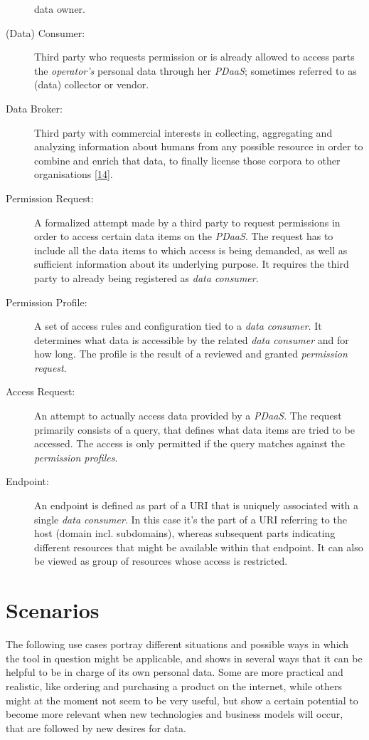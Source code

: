 \documentclass[12pt,english,a4paper,titlepage,cleardoublepage=empty,dottedtoc]{report}
\begin{document}
\begin{description}
data owner.
\item[\protect\hypertarget{terminologies--consumer}{}{(Data) Consumer}:]
Third party who requests permission or is already allowed to access
parts the \emph{operator's} personal data through her \emph{PDaaS};
sometimes referred to as (data) collector or vendor.
\item[\protect\hypertarget{terminologies--data-broker}{}{Data Broker}:]
Third party with commercial interests in collecting, aggregating and
analyzing information about humans from any possible resource in order
to combine and enrich that data, to finally license those corpora to
other organisations
{[}\protect\hyperlink{ref-report_2014_data-brokers}{14}{]}.
\item[Permission Request:]
A formalized attempt made by a third party to request permissions in
order to access certain data items on the \emph{PDaaS}. The request has
to include all the data items to which access is being demanded, as well
as sufficient information about its underlying purpose. It requires the
third party to already being registered as \emph{data consumer}.
\item[Permission Profile:]
A set of access rules and configuration tied to a \emph{data consumer}.
It determines what data is accessible by the related \emph{data
consumer} and for how long. The profile is the result of a reviewed and
granted \emph{permission request}.
\item[Access Request:]
An attempt to actually access data provided by a \emph{PDaaS}. The
request primarily consists of a query, that defines what data items are
tried to be accessed. The access is only permitted if the query matches
against the \emph{permission profiles}.
\item[Endpoint:]
An endpoint is defined as part of a URI that is uniquely associated with
a single \emph{data consumer}. In this case it's the part of a URI
referring to the host (domain incl. subdomains), whereas subsequent
parts indicating different resources that might be available within that
endpoint. It can also be viewed as group of resources whose access is
restricted.
\end{description}

\hypertarget{scenarios}{\section{Scenarios}\label{scenarios}}

The following use cases portray different situations and possible ways
in which the tool in question might be applicable, and shows in several
ways that it can be helpful to be in charge of its own personal data.
Some are more practical and realistic, like ordering and purchasing a
product on the internet, while others might at the moment not seem to be
very useful, but show a certain potential to become more relevant when
new technologies and business models will occur, that are followed by
new desires for data.
\end{document}
